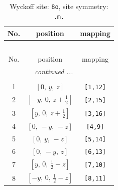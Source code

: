 \documentclass[fleqn,8pt]{jsarticle}
\begin{document}
\renewcommand{\arraystretch}{1.2}
\begin{longtable}{ccc}
\caption{Wyckoff site: {\tt 8o}, site symmetry: {\tt .m.}}
 \\
 \hline \hline
No. & position & mapping \\ \hline \endfirsthead

\multicolumn{2}{l}{\tablename\ \thetable{}} \\
 \hline \hline
No. & position & mapping \\ \hline \endhead

 \hline \hline
\multicolumn{2}{r}{\footnotesize\it continued ...} \\ \endfoot

 \hline \hline
\multicolumn{2}{r}{} \\ \endlastfoot

1 & $\left[ 0,\, y,\, z \right]$ & {\tt [1,12]} \\ \hline
2 & $\left[ - y,\, 0,\, z + \frac{1}{2} \right]$ & {\tt [2,15]} \\ \hline
3 & $\left[ y,\, 0,\, z + \frac{1}{2} \right]$ & {\tt [3,16]} \\ \hline
4 & $\left[ 0,\, - y,\, - z \right]$ & {\tt [4,9]} \\ \hline
5 & $\left[ 0,\, y,\, - z \right]$ & {\tt [5,14]} \\ \hline
6 & $\left[ 0,\, - y,\, z \right]$ & {\tt [6,13]} \\ \hline
7 & $\left[ y,\, 0,\, \frac{1}{2} - z \right]$ & {\tt [7,10]} \\ \hline
8 & $\left[ - y,\, 0,\, \frac{1}{2} - z \right]$ & {\tt [8,11]} \\
\end{longtable}
\renewcommand{\arraystretch}{1.2}
\end{document}
